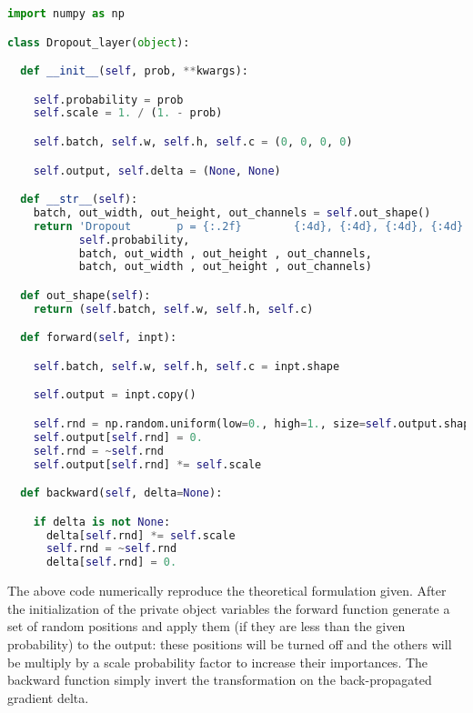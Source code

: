 \documentclass{standalone}
\begin{document}
\lstset{style=snippet}
\begin{lstlisting}[language=Python, caption=NumPyNet version of Dropout function, label=code:py_dropout]
import numpy as np

class Dropout_layer(object):

  def __init__(self, prob, **kwargs):

    self.probability = prob
    self.scale = 1. / (1. - prob)

    self.batch, self.w, self.h, self.c = (0, 0, 0, 0)

    self.output, self.delta = (None, None)

  def __str__(self):
    batch, out_width, out_height, out_channels = self.out_shape()
    return 'Dropout       p = {:.2f}        {:4d}, {:4d}, {:4d}, {:4d}  ->  {:4d}, {:4d}, {:4d}, {:4d}'.format(
           self.probability,
           batch, out_width , out_height , out_channels,
           batch, out_width , out_height , out_channels)

  def out_shape(self):
    return (self.batch, self.w, self.h, self.c)

  def forward(self, inpt):

    self.batch, self.w, self.h, self.c = inpt.shape

    self.output = inpt.copy()

    self.rnd = np.random.uniform(low=0., high=1., size=self.output.shape) < self.probability
    self.output[self.rnd] = 0.
    self.rnd = ~self.rnd
    self.output[self.rnd] *= self.scale

  def backward(self, delta=None):

    if delta is not None:
      delta[self.rnd] *= self.scale
      self.rnd = ~self.rnd
      delta[self.rnd] = 0.

\end{lstlisting}

The above code numerically reproduce the theoretical formulation given.
After the initialization of the private object variables the forward function generate a set of random positions and apply them (if they are less than the given probability) to the output: these positions will be turned off and the others will be multiply by a scale probability factor to increase their importances.
The backward function simply invert the transformation on the back-propagated gradient \textsf{delta}.
\end{document}

